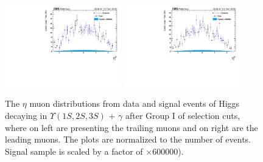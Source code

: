 \begin{figure}[!htbp]
\begin{center}
\includegraphics[width=0.45\textwidth]{figures/outputPlots/HtoUpsilon_Cat0_ZZZZZ/nEvts/data_x_mc/withKinCuts/h_withKin_TrailingMu_eta}\hspace*{1.cm}
\includegraphics[width=0.45\textwidth]{figures/outputPlots/HtoUpsilon_Cat0_ZZZZZ/nEvts/data_x_mc/withKinCuts/h_withKin_LeadingMu_eta}
\end{center}\vspace*{-.5cm}
\caption{The $\eta$ muon distributions from data and signal events of Higgs decaying in $\Upsilon(1S,2S,3S)$ + $\gamma$ after Group I of selection cuts, where on left are presenting the trailing muons and on right are the leading muons. The plots are normalized to the number of events. Signal sample is scaled by a factor of $\times 600000$).}
\label{fig:etaMuons_HtoUpsilon_Cat0_groupI_plus_II}
\end{figure}

